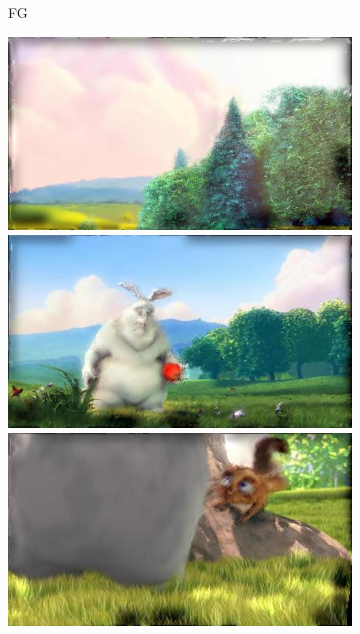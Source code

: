 \begin{figure}
\begin{subfigure}[t]{0.135\textwidth}
		\caption{FG}
	\end{subfigure}
	\begin{subfigure}[t]{0.135\textwidth}
		\includegraphics[width=\textwidth]{figures/stereo/bbb_frame-0004-12}\\
		\includegraphics[width=\textwidth]{figures/stereo/bbb_frame-0092-12}\\
		\includegraphics[width=\textwidth]{figures/stereo/bbb_frame-0124-12}\\

\end{subfigure}
\end{figure}
